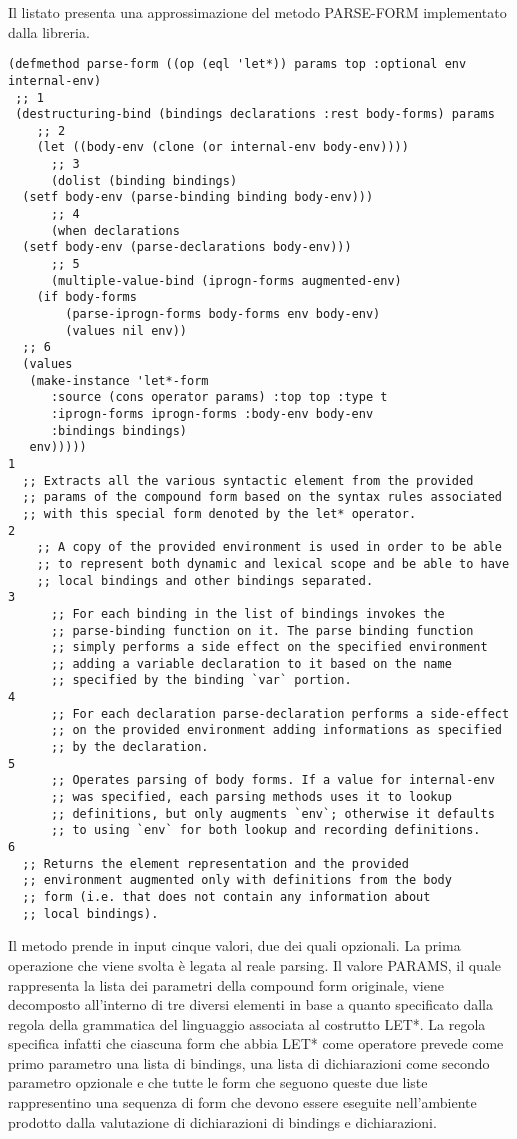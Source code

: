 Il listato presenta una approssimazione del metodo PARSE-FORM implementato
dalla libreria.

\begin{lstlisting}
(defmethod parse-form ((op (eql 'let*)) params top :optional env internal-env)
 ;; 1
 (destructuring-bind (bindings declarations :rest body-forms) params
    ;; 2
    (let ((body-env (clone (or internal-env body-env))))
      ;; 3
      (dolist (binding bindings)
  (setf body-env (parse-binding binding body-env)))
      ;; 4
      (when declarations
  (setf body-env (parse-declarations body-env)))
      ;; 5
      (multiple-value-bind (iprogn-forms augmented-env)
    (if body-forms
        (parse-iprogn-forms body-forms env body-env)
        (values nil env))
  ;; 6
  (values
   (make-instance 'let*-form
      :source (cons operator params) :top top :type t
      :iprogn-forms iprogn-forms :body-env body-env
      :bindings bindings)
   env)))))
1
  ;; Extracts all the various syntactic element from the provided
  ;; params of the compound form based on the syntax rules associated
  ;; with this special form denoted by the let* operator.
2
    ;; A copy of the provided environment is used in order to be able
    ;; to represent both dynamic and lexical scope and be able to have
    ;; local bindings and other bindings separated.
3
      ;; For each binding in the list of bindings invokes the
      ;; parse-binding function on it. The parse binding function
      ;; simply performs a side effect on the specified environment
      ;; adding a variable declaration to it based on the name
      ;; specified by the binding `var` portion.
4
      ;; For each declaration parse-declaration performs a side-effect
      ;; on the provided environment adding informations as specified
      ;; by the declaration.
5
      ;; Operates parsing of body forms. If a value for internal-env
      ;; was specified, each parsing methods uses it to lookup
      ;; definitions, but only augments `env`; otherwise it defaults
      ;; to using `env` for both lookup and recording definitions.
6
  ;; Returns the element representation and the provided
  ;; environment augmented only with definitions from the body
  ;; form (i.e. that does not contain any information about
  ;; local bindings).
\end{lstlisting}

Il metodo prende in input cinque valori, due dei quali opzionali. La prima
operazione che viene svolta è legata al reale parsing. Il valore PARAMS, il
quale rappresenta la lista dei parametri della compound form originale, viene
decomposto all’interno di tre diversi elementi in base a quanto specificato
dalla regola della grammatica del linguaggio associata al costrutto LET*. La
regola specifica infatti che ciascuna form che abbia LET* come operatore
prevede come primo parametro una lista di bindings, una lista di dichiarazioni
come secondo parametro opzionale e che tutte le form che seguono queste due
liste rappresentino una sequenza di form che devono essere eseguite
nell’ambiente prodotto dalla valutazione di dichiarazioni di bindings e
dichiarazioni.\\

